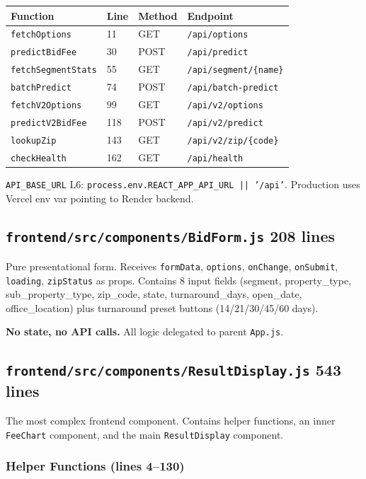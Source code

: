 \documentclass[11pt,a4paper]{article}
\newcommand{\file}[1]{\texttt{\color{gssblue!70!black}#1}}
\newcommand{\func}[1]{\texttt{\color{gssgreen!80!black}#1}}
\newcommand{\cls}[1]{\texttt{\color{uipurple}#1}}
\newcommand{\lineref}[1]{\textcolor{gssgray}{\small L#1}}
\newcommand{\uitag}[1]{\colorbox{uipurple!15}{\small\textcolor{uipurple}{\textbf{#1}}}}
\begin{document}
\begin{longtable}{l l l l}
\toprule
\textbf{Function} & \textbf{Line} & \textbf{Method} & \textbf{Endpoint} \\
\midrule
\endhead
\func{fetchOptions} & 11 & GET & \texttt{/api/options} \\
\func{predictBidFee} & 30 & POST & \texttt{/api/predict} \\
\func{fetchSegmentStats} & 55 & GET & \texttt{/api/segment/\{name\}} \\
\func{batchPredict} & 74 & POST & \texttt{/api/batch-predict} \\
\func{fetchV2Options} & 99 & GET & \texttt{/api/v2/options} \\
\func{predictV2BidFee} & 118 & POST & \texttt{/api/v2/predict} \\
\func{lookupZip} & 143 & GET & \texttt{/api/v2/zip/\{code\}} \\
\func{checkHealth} & 162 & GET & \texttt{/api/health} \\
\bottomrule
\end{longtable}

\texttt{API\_BASE\_URL} \lineref{6}: \texttt{process.env.REACT\_APP\_API\_URL || '/api'}.
Production uses Vercel env var pointing to Render backend.

\subsection{\file{frontend/src/components/BidForm.js} \uitag{208 lines}}

Pure presentational form. Receives \texttt{formData}, \texttt{options}, \texttt{onChange},
\texttt{onSubmit}, \texttt{loading}, \texttt{zipStatus} as props. Contains 8 input
fields (segment, property\_type, sub\_property\_type, zip\_code, state, turnaround\_days,
open\_date, office\_location) plus turnaround preset buttons (14/21/30/45/60 days).

\textbf{No state, no API calls.} All logic delegated to parent \file{App.js}.

\subsection{\file{frontend/src/components/ResultDisplay.js} \uitag{543 lines}}

The most complex frontend component. Contains helper functions, an inner
\cls{FeeChart} component, and the main \cls{ResultDisplay} component.

\subsubsection{Helper Functions (lines 4--130)}
\end{document}
